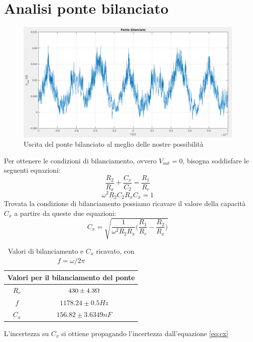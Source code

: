 \documentclass[12pt,]{article}
\begin{document}
\section{Analisi ponte bilanciato}
\begin{figure}[H]
\centering
\includegraphics[width=\textwidth]{pontebilanciato}
\caption{Uscita del ponte bilanciato al meglio delle nostre possibilità}
\end{figure}
Per ottenere le condizioni di bilanciamento, ovvero $V_{out}=0$, bisogna soddisfare le seguenti equazioni: 
 \begin{equation}
 \frac{R_2}{R_x} + \frac{C_x}{C_2} = \frac{R_1}{R_r}
 \end{equation}
 \begin{equation}
 \omega^2 R_2  C_2  R_x  C_x = 1 
 \end{equation}
Trovata la condizione di bilanciamento possiamo ricavare il valore della capacità $C_x$ a partire da queste due equazioni: 
\begin{equation}
\label{eq:cx}
C_x = \sqrt{\frac{1}{\omega^2 R_2 R_x} \biggl(\frac{R_1}{R_r} - \frac{R_2}{R_x} \biggr)}
\end{equation}
\begin{table}[H]
\centering
\begin{tabular}{c|c}
\toprule
\multicolumn{2}{c}{Valori per il bilanciamento del ponte}\\
\midrule
\rowcolor{black!20}$R_r$ & $430 \pm 4.3  \ohm$ \\
$f$ & $ 1178.24\pm 0.5 Hz $ \\
\rowcolor{black!20}$C_x$ & $156.82 \pm 3.6349 nF $ \\
\bottomrule
\end{tabular}
\caption{Valori di bilanciamento e $C_x$ ricavato, con $f = \omega/2\pi$}
\end{table}
L'incertezza su $C_x$ si ottiene propagando l'incertezza dall'equazione \eqref{eq:cx}
\end{document}
